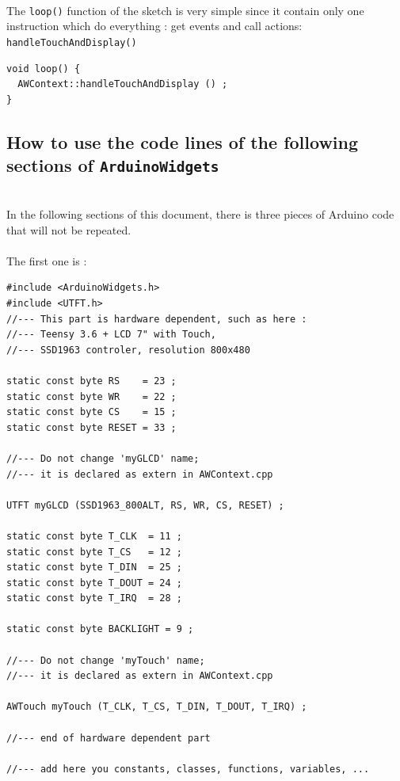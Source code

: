 \documentclass[a4paper,11pt]{extarticle}
\begin{document}
~\\The \texttt{loop()} function of the sketch is very simple since it contain only one instruction which do everything : get events and call actions: \texttt{handleTouchAndDisplay()} \\
 
\begin{lstlisting}[language=Arduinonl]
void loop() {
  AWContext::handleTouchAndDisplay () ;
}  
\end{lstlisting}
  
\newpage
\subsection{How to use the code lines of the following sections of \texttt{ArduinoWidgets}}

~\\In the following sections of this document, there is three pieces of Arduino code that will not be repeated.\\
~\\The first one is :
\begin{lstlisting}[language=Arduinonl]
#include <ArduinoWidgets.h>
#include <UTFT.h>
//--- This part is hardware dependent, such as here :
//--- Teensy 3.6 + LCD 7" with Touch, 
//--- SSD1963 controler, resolution 800x480

static const byte RS    = 23 ;
static const byte WR    = 22 ;
static const byte CS    = 15 ;
static const byte RESET = 33 ;

//--- Do not change 'myGLCD' name; 
//--- it is declared as extern in AWContext.cpp

UTFT myGLCD (SSD1963_800ALT, RS, WR, CS, RESET) ;

static const byte T_CLK  = 11 ;
static const byte T_CS   = 12 ;
static const byte T_DIN  = 25 ;
static const byte T_DOUT = 24 ;
static const byte T_IRQ  = 28 ;

static const byte BACKLIGHT = 9 ;

//--- Do not change 'myTouch' name; 
//--- it is declared as extern in AWContext.cpp

AWTouch myTouch (T_CLK, T_CS, T_DIN, T_DOUT, T_IRQ) ;

//--- end of hardware dependent part 

//--- add here you constants, classes, functions, variables, ...
\end{lstlisting}
\end{document}
